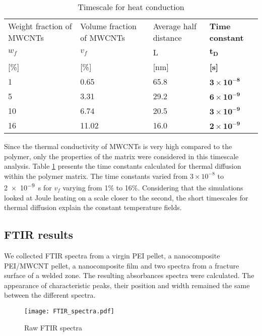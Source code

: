 \begin{table}[htb]
	\centering
	\caption{Timescale for heat conduction}
	\begin{tabular}{@{}p{2.8cm}p{3.0cm}p{2.2cm}p{3.2cm}@{}}
		\toprule
		Weight fraction of MWCNTs & Volume fraction of MWCNTs & Average half distance & \textbf{Time constant}     \\
		$w_f$                     & $v_f$                     & L                     & $\mathbf{t_D}$             \\
		{[}\%{]}                  & {[}\%{]	}                 & {[}nm{]}              & \textbf{{[}s{]}}           \\ \midrule
		1                         & 0.65                      & 65.8                  & $\mathbf{3\times 10^{-8}}$ \\
		5                         & 3.31                      & 29.2                  & $\mathbf{6\times 10^{-9}}$ \\
		10                        & 6.74                      & 20.5                  & $\mathbf{3\times 10^{-9}}$ \\
		16                        & 11.02                     & 16.0                  & $\mathbf{2\times 10^{-9}}$ \\ \bottomrule
	\end{tabular}
	\label{tab:results_timescale}
\end{table}

Since the thermal conductivity of MWCNTs is very high compared to the polymer, only the properties of the matrix were considered in this timescale analysis. 
Table \ref{tab:results_timescale} presents the time constants calculated for thermal diffusion within the polymer matrix. 
The time constants varied from $3 \times 10^{-8}$ to \SI{2e-9}{\second} for $v_f$ varying from 1\% to 16\%. 
Considering that the simulations looked at Joule heating on a scale closer to the second, the short timescales for thermal diffusion explain the constant temperature fields. 

\subsection{FTIR results}

We collected FTIR spectra from a virgin PEI pellet, a nanocomposite PEI/MWCNT pellet, a nanocomposite film and two spectra from a fracture surface of a welded zone. 
The resulting absorbances spectra were calculated. 
The appearance of characteristic peaks, their position and width remained the same between the different spectra. 

\begin{figure}[h!]
	\center
	\texttt{[image: FTIR\_spectra.pdf]}
	\caption{Raw FTIR spectra \cite{Brassard2018_figshare_article1}}
	\label{fig:FTIR_spectra}
\end{figure}
